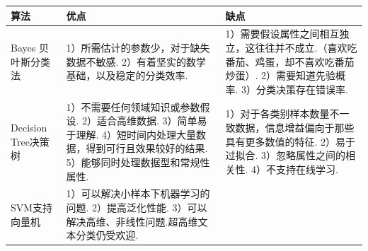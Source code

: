 \begin{longtable}[]{lll}
\toprule
\begin{minipage}[b]{0.04\columnwidth}
  \raggedright
  算法
\end{minipage}
&
\begin{minipage}[b]{0.04\columnwidth}
  \raggedright
  优点
\end{minipage}
&
\begin{minipage}[b]{0.04\columnwidth}
  \raggedright
  缺点
\end{minipage}
\tabularnewline
\midrule
\endhead
\begin{minipage}[t]{0.04\columnwidth}
  \raggedright
  \strut
  Bayes 贝叶斯分类法
  \strut
\end{minipage}
&
\begin{minipage}[t]{0.04\columnwidth}
  \raggedright
  \strut
  1）所需估计的参数少，对于缺失数据不敏感.
  2）有着坚实的数学基础，以及稳定的分类效率.
  \strut
\end{minipage}
&
\begin{minipage}[t]{0.04\columnwidth}
  \raggedright
  \strut
  1）需要假设属性之间相互独立，这往往并不成立.（喜欢吃番茄、鸡蛋，却不喜欢吃番茄炒蛋）.
  2）需要知道先验概率.
  3）分类决策存在错误率.
  \strut
\end{minipage}
\tabularnewline
\begin{minipage}[t]{0.04\columnwidth}
  \raggedright
  \strut
  Decision Tree决策树
  \strut
\end{minipage}
&
\begin{minipage}[t]{0.04\columnwidth}
  \raggedright
  \strut
  1）不需要任何领域知识或参数假设.
  2）适合高维数据.
  3）简单易于理解.
  4）短时间内处理大量数据，得到可行且效果较好的结果.
  5）能够同时处理数据型和常规性属性.
  \strut
\end{minipage}
&
\begin{minipage}[t]{0.04\columnwidth}
  \raggedright
  \strut
  1）对于各类别样本数量不一致数据，信息增益偏向于那些具有更多数值的特征.
  2）易于过拟合.
  3）忽略属性之间的相关性.
  4）不支持在线学习.
  \strut
\end{minipage}
\tabularnewline
\begin{minipage}[t]{0.04\columnwidth}
  \raggedright
  \strut
  SVM支持向量机
  \strut
\end{minipage}
&
\begin{minipage}[t]{0.04\columnwidth}
  \raggedright
  \strut
  1）可以解决小样本下机器学习的问题.
  2）提高泛化性能.
  3）可以解决高维、非线性问题.超高维文本分类仍受欢迎.

\end{minipage}
\end{longtable}
